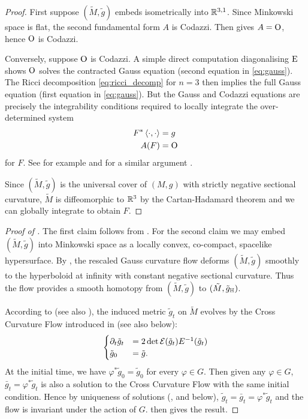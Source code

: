 \documentclass[a4paper,12pt]{amsart}
\begin{document}
\begin{proof}
First suppose \((\tilde{M}, \tilde{g})\) embeds isometrically into \(\mathbb{R}^{3,1}\). Since Minkowski space is flat, the second fundamental form \(A\) is Codazzi. Then  gives \(A = \operatorname{O}\), hence \(\operatorname{O}\) is Codazzi.

Conversely, suppose \(\operatorname{O}\) is Codazzi. A simple direct computation diagonalising \(\operatorname{E}\) shows $\operatorname{O}$ solves the contracted Gauss equation (second equation in \eqref{eq:gauss}). The Ricci decomposition \eqref{eq:ricci_decomp} for \(n=3\) then implies the full Gauss equation (first equation in \eqref{eq:gauss}). But the Gauss and Codazzi equations are precisely the integrability conditions required to locally integrate the over-determined system
\begin{align*}
F^{\ast} \left\langle \cdot,\cdot \right\rangle &= g \\
A(F) &= \operatorname{O}
\end{align*}
for \(F\). See for example \cite[Theorem 7]{MR1713298} and for a similar argument \cite[Chapter VI.12, p. 146 and Theorem V, p.393]{MR1013365}.

Since \((\tilde{M}, \tilde{g})\) is the universal cover of \((M, g)\) with strictly negative sectional curvature, \(\tilde{M}\) is diffeomorphic to \(\mathbb{R}^3\) by the Cartan-Hadamard theorem and we can globally integrate to obtain \(F\).
\end{proof}

\begin{proof}
[Proof of ]

The first claim follows from . For the second claim we may embed \((\tilde{M}, \tilde{g})\) into Minkowski space as a locally convex, co-compact, spacelike hypersurface. By \cite[Theorem 1.1]{MR3344442}, the rescaled Gauss curvature flow deforms \((\tilde{M}, \tilde{g})\) smoothly to the hyperboloid at infinity with constant negative sectional curvature. Thus the flow provides a smooth homotopy from \((\tilde{M}, \tilde{g})\) to \((\tilde{M}, \tilde{g}_{\mathbb{H}})\).

According to \cite[Section 12]{MR3344442} (see also ), the induced metric \(\tilde{g}_t\) on \(\tilde{M}\) evolves by the Cross Curvature Flow introduced in \cite{MR2055396} (see also  below):
\[
\begin{cases}
\partial_t \tilde{g}_t &= 2\det \operatorname{\mathcal{E}}(\tilde{g}_{t}) E^{-1}(\tilde{g}_{t}) \\
\tilde{g}_0 &= \tilde{g}.
\end{cases}
\]
At the initial time, we have \(\varphi^{\ast} \tilde{g}_0 = \tilde{g}_0\) for every \(\varphi \in G\). Then given any \(\varphi \in G\), \(\bar{g}_t = \varphi^{\ast} \tilde{g}_t\) is also a solution to the Cross Curvature Flow with the same initial condition. Hence by uniqueness of solutions (\cite{MR2055396,MR2207496},  and  below), \(\tilde{g}_t = \bar{g}_t = \varphi^{\ast} \tilde{g}_t\) and the flow is invariant under the action of \(G\).  then gives the result.
\end{proof}
\end{document}
